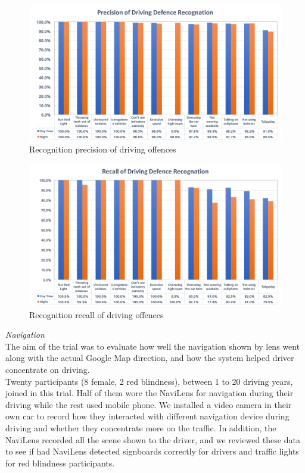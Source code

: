 \documentclass{chi-ext}
\begin{document}
\begin{multicols}{2}
\begin{figure}
\centering
 \includegraphics[width=0.8\columnwidth]{Precision.png}
 \caption{Recognition precision of driving offences }
 \label{fig:Precison}
\end{figure}

\begin{figure}
\centering
 \includegraphics[width=0.8\columnwidth]{recall.png}
 \caption{Recognition recall of driving offences }
 \label{fig:recall}
\end{figure}

\emph{Navigation}\\
The aim of the trial was to evaluate how well the navigation shown by lens went along with the actual Google Map direction, and how the system helped driver concentrate on driving.\\

Twenty participants (8 female, 2 red blindness), between 1 to 20 driving years, joined in this trial. Half of them wore the NaviLens for navigation during their driving while the rest used mobile phone. We installed a video camera in their own car to record how they interacted with different navigation device during driving and whether they concentrate more on the traffic. In addition, the NaviLens recorded all the scene shown to the driver, and we reviewed these data to see if had NaviLens detected signboards correctly for drivers and traffic lights for red blindness participants.\\


\end{multicols}
\end{document}
